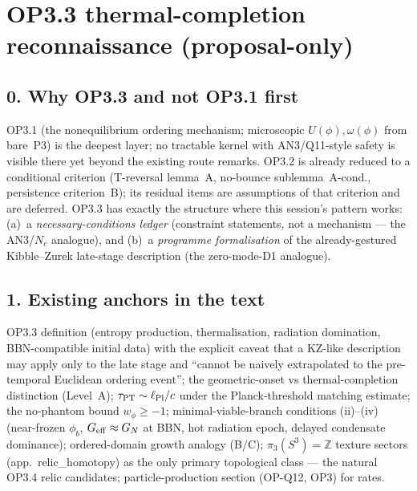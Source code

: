 \section*{OP3.3 thermal-completion reconnaissance (proposal-only)}

\subsection*{0. Why OP3.3 and not OP3.1 first}
OP3.1 (the nonequilibrium ordering mechanism; microscopic
$U(\phi),\omega(\phi)$ from bare~P3) is the deepest layer; no
tractable kernel with AN3/Q11-style safety is visible there yet
beyond the existing route remarks.
OP3.2 is already reduced to a conditional criterion (T-reversal
lemma~A, no-bounce sublemma~A-cond., persistence criterion~B);
its residual items are assumptions of that criterion and are
deferred.
OP3.3 has exactly the structure where this session's pattern
works: (a)~a \emph{necessary-conditions ledger} (constraint
statements, not a mechanism --- the AN3/$N_c$ analogue), and
(b)~a \emph{programme formalisation} of the already-gestured
Kibble--Zurek late-stage description (the zero-mode-D1 analogue).

\subsection*{1. Existing anchors in the text}
OP3.3 definition (entropy production, thermalisation, radiation
domination, BBN-compatible initial data) with the explicit caveat
that a KZ-like description may apply only to the late stage and
``cannot be naively extrapolated to the pre-temporal Euclidean
ordering event''; the geometric-onset vs thermal-completion
distinction (Level~A); $\tau_{\rm PT}\sim\ell_{\rm Pl}/c$ under the
Planck-threshold matching estimate; the no-phantom bound
$w_\phi\ge-1$; minimal-viable-branch conditions (ii)--(iv)
(near-frozen $\phi_b$, $G_{\rm eff}\approx G_N$ at BBN, hot
radiation epoch, delayed condensate dominance); ordered-domain
growth analogy (B/C); $\pi_3(S^3)=\mathbb Z$ texture sectors
(app.~relic\_homotopy) as the only primary topological class ---
the natural OP3.4 relic candidates; particle-production section
(OP-Q12, OP3) for rates.


